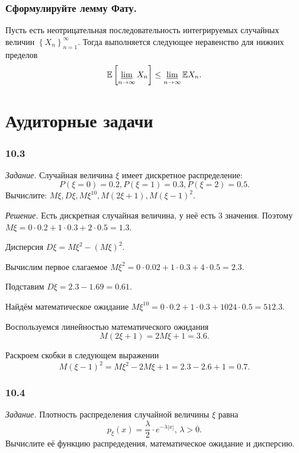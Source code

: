 \subsubsection*{Сформулируйте лемму Фату.}

Пусть есть неотрицательная последовательность интегрируемых случайных величин $ \left\{ X_n \right\}_{n=1}^{ \infty }$.
Тогда выполняется следующее неравенство для нижних пределов
$$ \mathbb{E} \left[ \varliminf \limits_{n \to \infty } X_n \right] \leq \varliminf \limits_{n \to \infty } \mathbb{E}X_n.$$

\section*{Аудиторные задачи}

\subsubsection*{10.3}

\textit{Задание.}
Случайная величина $ \xi $ имеет дискретное распределение:
$$P \left( \xi = 0 \right) = 0.2,
P \left( \xi = 1 \right) = 0.3,
P \left( \xi = 2 \right) = 0.5.$$
Вычислите: $M \xi, D \xi, M \xi^{10}, M \left( 2 \xi + 1 \right), M \left( \xi - 1 \right)^2$.

\textit{Решение.} Есть дискретная случайная величина, у неё есть 3 значения.
Поэтому $M \xi = 0 \cdot 0.2 + 1 \cdot 0.3 + 2 \cdot 0.5 = 1.3$.

Дисперсия $D \xi = M \xi^2 - \left( M \xi \right)^2$.

Вычислим первое слагаемое $M \xi^2 = 0 \cdot 0.02 + 1 \cdot 0.3 + 4 \cdot 0.5 = 2.3$.

Подставим $D \xi = 2.3 - 1.69 = 0.61$.

Найдём математическое ожидание $M \xi^{10} = 0 \cdot 0.2 + 1 \cdot 0.3 + 1024 \cdot 0.5 = 512.3$.

Воспользуемся линейностью математического ожидания
$$M \left( 2 \xi + 1 \right) =
2 M \xi + 1 =
3.6.$$

Раскроем скобки в следующем выражении
$$M \left( \xi - 1 \right)^2 =
M \xi^2 - 2 M \xi + 1 =
2.3 - 2.6 + 1 =
0.7.$$

\subsubsection*{10.4}

\textit{Задание.} Плотность распределения случайной величины $ \xi $ равна
$$p_{ \xi } \left( x \right) =
\frac{ \lambda }{2} \cdot e^{- \lambda \left| x \right| }, \, \lambda > 0.$$
Вычислите её функцию распредедения, математическое ожидание и дисперсию.

